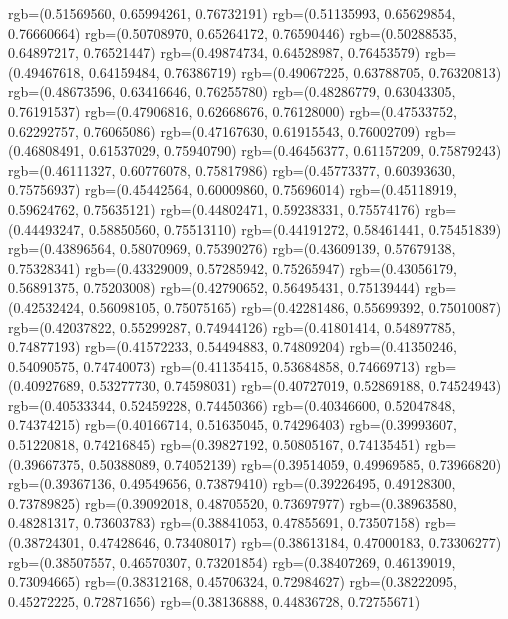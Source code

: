 {{        rgb=(0.51569560, 0.65994261, 0.76732191)
        rgb=(0.51135993, 0.65629854, 0.76660664)
        rgb=(0.50708970, 0.65264172, 0.76590446)
        rgb=(0.50288535, 0.64897217, 0.76521447)
        rgb=(0.49874734, 0.64528987, 0.76453579)
        rgb=(0.49467618, 0.64159484, 0.76386719)
        rgb=(0.49067225, 0.63788705, 0.76320813)
        rgb=(0.48673596, 0.63416646, 0.76255780)
        rgb=(0.48286779, 0.63043305, 0.76191537)
        rgb=(0.47906816, 0.62668676, 0.76128000)
        rgb=(0.47533752, 0.62292757, 0.76065086)
        rgb=(0.47167630, 0.61915543, 0.76002709)
        rgb=(0.46808491, 0.61537029, 0.75940790)
        rgb=(0.46456377, 0.61157209, 0.75879243)
        rgb=(0.46111327, 0.60776078, 0.75817986)
        rgb=(0.45773377, 0.60393630, 0.75756937)
        rgb=(0.45442564, 0.60009860, 0.75696014)
        rgb=(0.45118919, 0.59624762, 0.75635121)
        rgb=(0.44802471, 0.59238331, 0.75574176)
        rgb=(0.44493247, 0.58850560, 0.75513110)
        rgb=(0.44191272, 0.58461441, 0.75451839)
        rgb=(0.43896564, 0.58070969, 0.75390276)
        rgb=(0.43609139, 0.57679138, 0.75328341)
        rgb=(0.43329009, 0.57285942, 0.75265947)
        rgb=(0.43056179, 0.56891375, 0.75203008)
        rgb=(0.42790652, 0.56495431, 0.75139444)
        rgb=(0.42532424, 0.56098105, 0.75075165)
        rgb=(0.42281486, 0.55699392, 0.75010087)
        rgb=(0.42037822, 0.55299287, 0.74944126)
        rgb=(0.41801414, 0.54897785, 0.74877193)
        rgb=(0.41572233, 0.54494883, 0.74809204)
        rgb=(0.41350246, 0.54090575, 0.74740073)
        rgb=(0.41135415, 0.53684858, 0.74669713)
        rgb=(0.40927689, 0.53277730, 0.74598031)
        rgb=(0.40727019, 0.52869188, 0.74524943)
        rgb=(0.40533344, 0.52459228, 0.74450366)
        rgb=(0.40346600, 0.52047848, 0.74374215)
        rgb=(0.40166714, 0.51635045, 0.74296403)
        rgb=(0.39993607, 0.51220818, 0.74216845)
        rgb=(0.39827192, 0.50805167, 0.74135451)
        rgb=(0.39667375, 0.50388089, 0.74052139)
        rgb=(0.39514059, 0.49969585, 0.73966820)
        rgb=(0.39367136, 0.49549656, 0.73879410)
        rgb=(0.39226495, 0.49128300, 0.73789825)
        rgb=(0.39092018, 0.48705520, 0.73697977)
        rgb=(0.38963580, 0.48281317, 0.73603783)
        rgb=(0.38841053, 0.47855691, 0.73507158)
        rgb=(0.38724301, 0.47428646, 0.73408017)
        rgb=(0.38613184, 0.47000183, 0.73306277)
        rgb=(0.38507557, 0.46570307, 0.73201854)
        rgb=(0.38407269, 0.46139019, 0.73094665)
        rgb=(0.38312168, 0.45706324, 0.72984627)
        rgb=(0.38222095, 0.45272225, 0.72871656)
        rgb=(0.38136888, 0.44836728, 0.72755671)
}}
